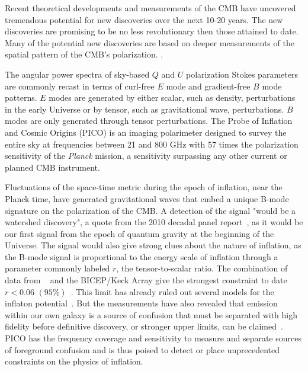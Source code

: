 \documentclass[PICOReport.tex]{subfiles}
\begin{document}

Recent theoretical developments and measurements of the \ac{CMB} 
have uncovered tremendous potential for new discoveries over the next 10-20 years. The new discoveries are promising to be 
no less revolutionary then those attained to date. Many of the potential new discoveries are based on deeper
measurements of the spatial pattern of the CMB's polarization. .

The angular power spectra of sky-based $Q$ and $U$ polarization Stokes parameters are commonly recast in terms
of curl-free $E$ mode and gradient-free $B$ mode patterns. $E$ modes are generated by either scalar, such as density, perturbations
in the early Universe or by tensor, such as gravitational wave, perturbations. $B$ modes are only generated through tensor
perturbations. The Probe of Inflation and Cosmic Origins (PICO) is an imaging polarimeter designed to survey the entire 
sky at frequencies between 21 and 800 GHz with 57 times the polarization sensitivity of the {\it Planck} mission, a sensitivity 
surpassing any other current or planned CMB instrument. 

Fluctuations of the space-time metric during the epoch of inflation, near the Planck time, have generated gravitational waves 
that embed a unique B-mode signature on the polarization of the CMB. A detection of the signal "would be a watershed discovery", 
a quote from the 2010 decadal panel report~\citep{nwnh}, as it would be our first signal from the epoch of quantum gravity 
at the beginning of the Universe. The signal would also give strong clues 
about the nature of inflation, as the B-mode signal is proportional to the energy scale of inflation through a parameter 
commonly labeled $r$, the tensor-to-scalar ratio. 
The combination of data from \planck~ and the BICEP/Keck Array give the strongest constraint to date 
$r<0.06\,\, (95\%)$~\citep{rlimit}.  This limit has already ruled out several 
models for the inflaton potential~\citep{planck2018inflation}. 
But the measurements have also 
revealed that emission within our own galaxy is a source of confusion that must be separated with high fidelity 
before definitive discovery, or stronger upper limits, can be claimed~\citep{whichplanck}. 
PICO has the frequency coverage and sensitivity to measure and separate sources of foreground confusion and is thus 
poised to detect or place unprecedented constraints on the physics of inflation. 
\end{document}
